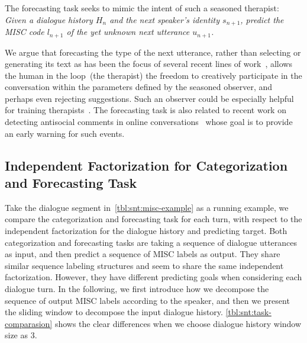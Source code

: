 The forecasting task seeks to mimic the intent of such a seasoned
therapist: \emph{Given a dialogue history $H_n$ and the next speaker's
  identity $s_{n+1}$, predict the MISC code $l_{n+1}$ of the yet
  unknown next utterance $u_{n+1}$.}

We argue that forecasting the type of the next utterance, rather than
selecting or generating its text as has been the focus of several
recent lines of work~\citep[\eg,][]{schatzmann2005quantitative,ubuntu,DSTC7},
allows the human in the loop~(the therapist) the freedom to
creatively participate in the conversation within the parameters
defined by the seasoned observer, and perhaps even rejecting
suggestions. Such an observer could be especially helpful for
training therapists~\citep{imel2017technology}.
%
The forecasting task is also related to recent work on detecting
antisocial comments in online
conversations~\citep{zhang2018conversations} whose goal is to
provide an early warning for such events.

\subsection[Independent Factorization for Categorization and
Forecasting Task]{Independent Factorization for Categorization \\and
  Forecasting Task}
\label{ssec:snt:comparative-tasks}

Take the dialogue segment in~\autoref{tbl:snt:misc-example} as a
running example, we compare the categorization and forecasting task
for each turn, with respect to the independent factorization for the
dialogue history and predicting target. Both categorization and
forecasting tasks are taking a sequence of dialogue utterances as
input, and then predict a sequence of MISC labels as output. They
share similar sequence labeling structures and seem to share the
same independent factorization. However, they have different
predicting goals when considering each dialogue turn. In the
following, we first introduce how we decompose the sequence of output
MISC labels according to the speaker, and then we present the
sliding window to decompose the input dialogue
history. \autoref{tbl:snt:task-comparasion} shows the clear
differences when we choose dialogue history window size as 3.

